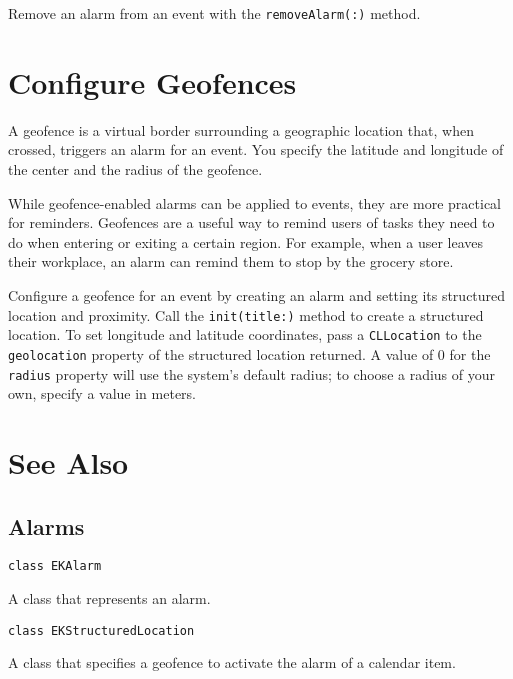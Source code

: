 \documentclass{article}
\begin{document}
Remove an alarm from an event with the \texttt{removeAlarm(:)} method.

\section*{Configure Geofences}
A geofence is a virtual border surrounding a geographic location that, when crossed, triggers an alarm for an
event. You specify the latitude and longitude of the center and the radius of the geofence.

While geofence-enabled alarms can be applied to events, they are more practical for reminders. Geofences are a
useful way to remind users of tasks they need to do when entering or exiting a certain region. For example, when
a user leaves their workplace, an alarm can remind them to stop by the grocery store.

\noindent{}

Configure a geofence for an event by creating an alarm and setting its structured location and proximity. Call
the \texttt{init(title:)} method to create a structured location. To set longitude and latitude coordinates, pass
a \texttt{CLLocation} to the \texttt{geolocation} property of the structured location returned. A value of 0 for
the \texttt{radius} property will use the system's default radius; to choose a radius of your own, specify a value in meters.

\section*{See Also}
\subsection*{Alarms}
\noindent \texttt{class EKAlarm}

A class that represents an alarm.

\noindent \texttt{class EKStructuredLocation}

A class that specifies a geofence to activate the alarm of a calendar item.

\newpage
\end{document}
